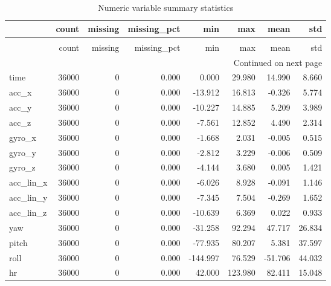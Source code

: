 \begin{longtable}{lrrrrrrr}
\caption{Numeric variable summary statistics}
\label{tab:numeric_summary_stats}\\
\toprule
{} &  count &  missing &  missing\_pct &      min &     max &    mean &    std \\
\midrule
\endfirsthead
\caption[]{Numeric variable summary statistics} \\
\toprule
{} &  count &  missing &  missing\_pct &      min &     max &    mean &    std \\
\midrule
\endhead
\midrule
\multicolumn{8}{r}{{Continued on next page}} \\
\midrule
\endfoot

\bottomrule
\endlastfoot
time      &  36000 &        0 &        0.000 &    0.000 &  29.980 &  14.990 &  8.660 \\
acc\_x     &  36000 &        0 &        0.000 &  -13.912 &  16.813 &  -0.326 &  5.774 \\
acc\_y     &  36000 &        0 &        0.000 &  -10.227 &  14.885 &   5.209 &  3.989 \\
acc\_z     &  36000 &        0 &        0.000 &   -7.561 &  12.852 &   4.490 &  2.314 \\
gyro\_x    &  36000 &        0 &        0.000 &   -1.668 &   2.031 &  -0.005 &  0.515 \\
gyro\_y    &  36000 &        0 &        0.000 &   -2.812 &   3.229 &  -0.006 &  0.509 \\
gyro\_z    &  36000 &        0 &        0.000 &   -4.144 &   3.680 &   0.005 &  1.421 \\
acc\_lin\_x &  36000 &        0 &        0.000 &   -6.026 &   8.928 &  -0.091 &  1.146 \\
acc\_lin\_y &  36000 &        0 &        0.000 &   -7.345 &   7.504 &  -0.269 &  1.652 \\
acc\_lin\_z &  36000 &        0 &        0.000 &  -10.639 &   6.369 &   0.022 &  0.933 \\
yaw       &  36000 &        0 &        0.000 &  -31.258 &  92.294 &  47.717 & 26.834 \\
pitch     &  36000 &        0 &        0.000 &  -77.935 &  80.207 &   5.381 & 37.597 \\
roll      &  36000 &        0 &        0.000 & -144.997 &  76.529 & -51.706 & 44.032 \\
hr        &  36000 &        0 &        0.000 &   42.000 & 123.980 &  82.411 & 15.048 \\
\end{longtable}
